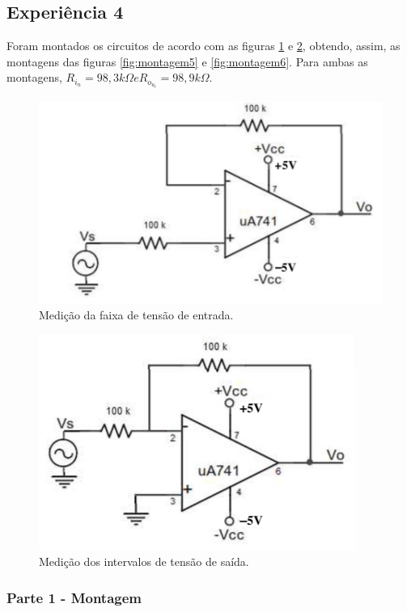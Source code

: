 \documentclass{abntex2}
\begin{document}
\clearpage

\subsection{Experiência 4}

Foram montados os circuitos de acordo com as figuras \ref{fig:circuito4} e \ref{fig:circuito5}, obtendo, assim, as montagens das figuras \ref{fig:montagem5} e \ref{fig:montagem6}.
Para ambas as montagens, $R_i_n = 98,3k\Omega e R_o_u_t = 98,9k\Omega$.
\begin{figure}[h]
  \centering
  \includegraphics[scale = 0.5]{exp4-1.png}
  \caption{Medição da faixa de tensão de entrada.}
  \label{fig:circuito4}
\end{figure}
\begin{figure}[h]
  \centering
  \includegraphics[scale = 0.5]{exp4-2.png}
  \caption{Medição dos intervalos de tensão de saída.}
  \label{fig:circuito5}
\end{figure}

\subsubsection{Parte 1 - Montagem}
\end{document}
